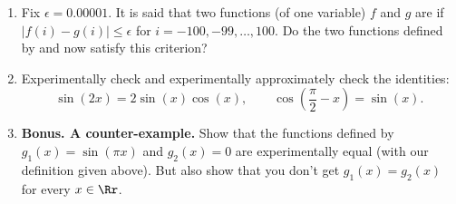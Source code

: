 \documentclass[11pt,class=report,crop=false]{standalone}
\begin{document}
\begin{activite}
\begin{enumerate}
\begin{enumerate}
    \item Fix $\epsilon = 0.00001$. It is said that two functions (of one variable) $f$ and $g$ are  if $|f(i)-g(i)| \le \epsilon$ for $i=-100,-99,\ldots,100$. Do the two functions defined by  and  now satisfy this criterion?
    
    \item Experimentally check and experimentally approximately check the identities:
    $$\sin(2x) = 2\sin(x)\cos(x), \qquad \cos\left(\frac\pi2-x\right)=\sin(x).$$

  
  \item \textbf{Bonus. A counter-example.}
  Show that the functions defined by $g_1(x) = \sin(\pi x)$ and $g_2(x)=0$ are experimentally equal (with our definition given above). But also show that you don't get $g_1(x) = g_2(x)$ for every $x\in\Rr$.
  
  \end{enumerate} 
\end{enumerate}

\end{activite}
\end{document}
